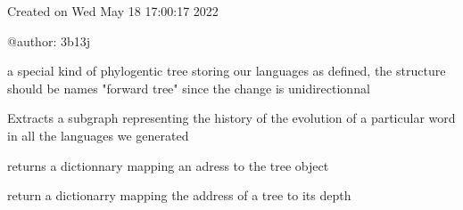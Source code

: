 \documentclass[letterpaper,10pt,english]{sphinxmanual}
\begin{document}
\label{\detokenize{index:module-Tree}}
\sphinxAtStartPar
Created on Wed May 18 17:00:17 2022

\sphinxAtStartPar
@author: 3b13j

\begin{fulllineitems}
\label{\detokenize{index:Tree.L_tree}}
\sphinxAtStartPar
a special kind of phylogentic tree storing our languages
as defined, the structure should be names "forward tree" since the change is unidirectionnal

\begin{fulllineitems}
\label{\detokenize{index:Tree.L_tree.elaborate_history_graph}}
\sphinxAtStartPar
Extracts a subgraph representing the history of the evolution of a particular word in all the languages we generated

\end{fulllineitems}


\begin{fulllineitems}
\label{\detokenize{index:Tree.L_tree.get_ad_2_tree}}
\sphinxAtStartPar
returns a dictionnary mapping an adress to the tree object

\end{fulllineitems}


\begin{fulllineitems}
\label{\detokenize{index:Tree.L_tree.get_depth}}
\sphinxAtStartPar
return a dictionarry mapping the address of a tree to its depth


\end{fulllineitems}
\end{fulllineitems}
\end{document}
